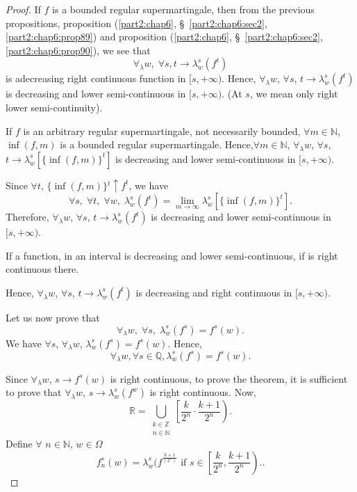 \begin{proof}
If $f$ is a bounded regular supermartingale, then from the previous
propositions, proposition (\ref{part2:chap6},
\S\ \ref{part2:chap6:sec2}, \ref{part2:chap6:prop89}) and proposition
(\ref{part2:chap6}, \S\ \ref{part2:chap6:sec2}, \ref{part2:chap6:prop90}), we see that 
$$
\forall_\lambda w, \; \forall s, t \to \lambda^s_w(f^t)
$$
is a\pageoriginale decreasing right continuous function in $[s, +
  \infty)$. Hence, $\forall_\lambda w$, $\forall s$, $t \to
  \lambda^s_w(f^t)$ is decreasing and lower semi-continuous in $[s, +
    \infty)$. (At $s$, we mean only right lower semi-continuity).

If $f$ is an arbitrary regular supermartingale, not necessarily
bounded, $\forall m \in \mathbb{N}$, $\inf (f,m)$ is a bounded regular
supermartingale. Hence,\break $\forall m\in \mathbb{N}$, $\forall_\lambda
w$, $\forall s$, $t\to \lambda^s_w[\{\inf (f,m)\}^t]$ is decreasing
and lower semi-continuous in $[s, + \infty)$. 

Since  $\forall t$, $\{\inf (f,m)\} {}^t \uparrow f^t$, we have 
$$
\forall s, \; \forall t, \; \forall w, \; \lambda^s_w(f^t) =
\lim\limits_{m \to \infty} \lambda^s_w [\{\inf (f,m)\}^t].
$$
Therefore, $\forall_\lambda w$, $\forall s$, $t \to \lambda^s_w(f^t)$
is decreasing and lower semi-continuous in $[s, + \infty)$. 

If a function, in an interval is decreasing and lower semi-continuous,
if is right continuous there.

Hence, $\forall_\lambda w$, $\forall s$, $t \to \lambda^s_w(f^t)$ is
decreasing and right continuous in $[s, + \infty)$.

Let us now prove that
$$
\forall_\lambda w, \; \forall s,\; \lambda^s_w(f^s) = f^s(w). 
$$
We have $\forall s$, $\forall_\lambda w$, \; $\lambda^s_w(f^s) =
f^s(w)$. Hence,
$$
\forall_\lambda w, \forall s \in \mathbb{Q}, \lambda^s_w(f^s) =
f^s(w). 
$$

Since $\forall_\lambda w$, $s \to f^s(w)$ is right continuous, to
prove the theorem, it is sufficient to prove that $\forall_\lambda w$,
$s \to \lambda^s_w(f^w)$ is right continuous. Now,
$$ 
\mathbb{R} = \bigcup\limits_{\substack{k \in \mathbb{Z}\\n\in
    \mathbb{N}}} \left[ \frac{k}{2^n}  \cdot \frac{k+1}{2^n}\right) .
$$
Define $\forall $ $n \in \mathbb{N}$, $w \in \Omega$
$$
f^s_n(w) = \lambda^s_w (f^{\frac{k+1}{(2^n)}} \text{ if } s \in \left[
  \frac{k}{2^n}, \frac{k+1}{2^n}   \right). . 
$$


\end{proof}
